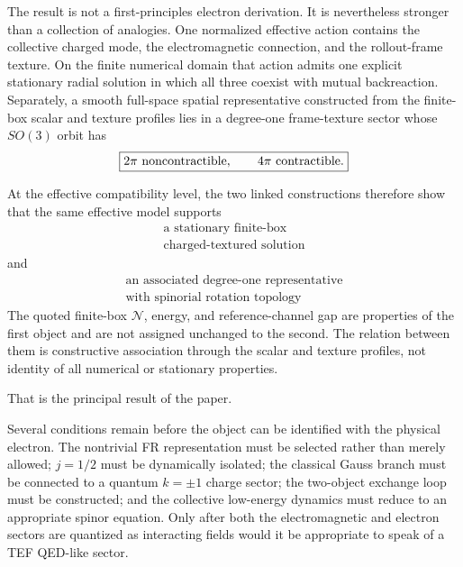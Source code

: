 \documentclass[11pt]{article}
\begin{document}
The result is not a first-principles electron derivation. It is nevertheless stronger than a collection of analogies. One normalized effective action contains the collective charged mode, the electromagnetic connection, and the rollout-frame texture. On the finite numerical domain that action admits one explicit stationary radial solution in which all three coexist with mutual backreaction. Separately, a smooth full-space spatial representative constructed from the finite-box scalar and texture profiles lies in a degree-one frame-texture sector whose \(SO(3)\) orbit has
\begin{equation}
\boxed{
2\pi\ {\rm noncontractible},
\qquad
4\pi\ {\rm contractible}.
}
\end{equation}

At the effective compatibility level, the two linked constructions therefore show that the same effective model supports
\begin{equation}
\boxed{
\begin{gathered}
\text{a stationary finite-box}
\\
\text{charged-textured solution}
\end{gathered}
}
\end{equation}
and
\begin{equation}
\boxed{
\begin{gathered}
\text{an associated degree-one representative}
\\
\text{with spinorial rotation topology}
\end{gathered}
}
\end{equation}
The quoted finite-box \(\mathcal N\), energy, and reference-channel gap are properties of the first object and are not assigned unchanged to the second. The relation between them is constructive association through the scalar and texture profiles, not identity of all numerical or stationary properties.

That is the principal result of the paper.

Several conditions remain before the object can be identified with the physical electron. The nontrivial FR representation must be selected rather than merely allowed; \(j=1/2\) must be dynamically isolated; the classical Gauss branch must be connected to a quantum \(k=\pm1\) charge sector; the two-object exchange loop must be constructed; and the collective low-energy dynamics must reduce to an appropriate spinor equation. Only after both the electromagnetic and electron sectors are quantized as interacting fields would it be appropriate to speak of a TEF QED-like sector.
\end{document}
